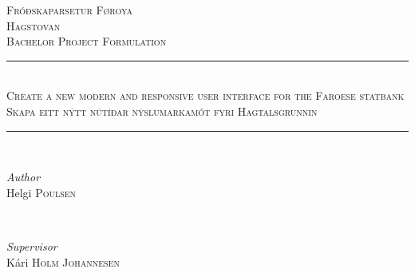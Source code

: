 \begin{titlepage} %
	\newcommand{\HRule}{\rule{\linewidth}{0.5mm}} %
	
	\center %
	
	
	\textsc{\LARGE Fróðskaparsetur Føroya}\\[0.5cm] %
		\textsc{\large Hagstovan}\\[1.5cm] %
		\textsc{\large Bachelor Project Formulation}\\[0.5cm] %

		\HRule\\[0.4cm]

	\textsc{\Large Create a new modern and responsive user interface for the Faroese statbank}\\[0.5cm] %
	
\textsc{\normalsize Skapa eitt nýtt nútíðar nýslumarkamót fyri Hagtalsgrunnin}\\[0.5cm]	
	
		\HRule\\[0.4cm]

	
	
	
	
	\begin{minipage}{0.4\textwidth}
		\begin{flushleft}
			\large
			\textit{Author}\\
			Helgi \textsc{Poulsen} %
		\end{flushleft}
	\end{minipage}
	~
	\begin{minipage}{0.4\textwidth}
		\begin{flushright}
			\large
			\textit{Supervisor}\\
			Kári \textsc{Holm Johannesen} %
		\end{flushright}
	\end{minipage}
	
	
	

\end{titlepage}
